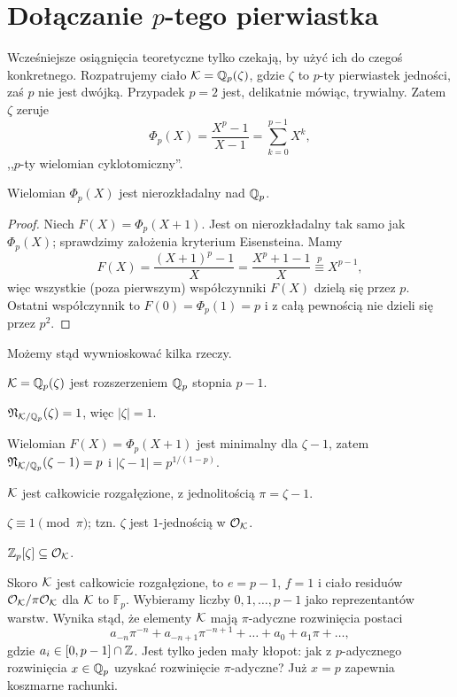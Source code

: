 \section{Dołączanie $p$-tego pierwiastka}
Wcześniejsze osiągnięcia teoretyczne tylko czekają, by użyć ich do czegoś konkretnego.
Rozpatrujemy ciało $\mathcal K = \mathbb Q_p(\zeta)$, gdzie $\zeta$ to $p$-ty pierwiastek jedności, zaś $p$ nie jest dwójką.
Przypadek $p = 2$ jest, delikatnie mówiąc, trywialny.
Zatem $\zeta$ zeruje
\[
	\Phi_p(X) = \frac{X^p-1}{X-1} = \sum_{k=0}^{p-1} X^k,
\]
,,$p$-ty wielomian cyklotomiczny''.

\begin{lemat}
	Wielomian $\Phi_p(X)$ jest nierozkładalny nad $\mathbb Q_p$.
\end{lemat}

\begin{proof}
	Niech $F(X) = \Phi_p(X+1)$. Jest on nierozkładalny tak samo jak $\Phi_p(X)$; sprawdzimy założenia kryterium Eisensteina.
	Mamy
	\[
		F(X)  = \frac{(X+1)^p - 1}{X} = \frac{X^p + 1 - 1}{X} \stackrel {p} \equiv X^{p-1},
	\]
	więc wszystkie (poza pierwszym) współczynniki $F(X)$ dzielą się przez $p$.
	Ostatni współczynnik to $F(0) = \Phi_p(1) = p$ i z całą pewnością nie dzieli się przez $p^2$.
\end{proof}

Możemy stąd wywnioskować kilka rzeczy.
\begin{enumx}
	\item $\mathcal K = \mathbb Q_p(\zeta)$ jest rozszerzeniem $\mathbb Q_p$ stopnia $p-1$.
	\item $\mathfrak N_{\mathcal K/ \mathbb Q_p}(\zeta) = 1$, więc $|\zeta| = 1$.
	\item Wielomian $F(X) = \Phi_p(X+1)$ jest minimalny dla $\zeta - 1$, zatem $\mathfrak N_{\mathcal K/\mathbb Q_p}(\zeta - 1) = p$ i $|\zeta-1| = p^{1/(1-p)}$.
	\item $\mathcal K$ jest całkowicie rozgałęzione, z jednolitością $\pi = \zeta- 1$.
	\item $\zeta \equiv 1 \pmod \pi$; tzn. $\zeta$ jest $1$-jednością w $\mathcal O_{\mathcal K}$.
	\item $\mathbb Z_p[\zeta] \subseteq \mathcal O_{\mathcal K}$.
\end{enumx}

Skoro $\mathcal K$ jest całkowicie rozgałęzione, to $e = p-1$, $f = 1$ i ciało residuów $\mathcal O_{\mathcal K} / \pi \mathcal O_{\mathcal K}$ dla $\mathcal K$ to $\mathbb F_p$.
Wybieramy liczby $0, 1, \dots, p-1$ jako reprezentantów warstw.
Wynika stąd, że elementy $\mathcal K$ mają $\pi$-adyczne rozwinięcia postaci
\[
	a_{-n}\pi^{-n} + a_{-n+1}\pi^{-n+1} + \ldots + a_0 + a_1 \pi + \ldots,
\]
gdzie $a_i \in [0, p-1] \cap \mathbb Z$.
Jest tylko jeden mały kłopot: jak z $p$-adycznego rozwinięcia $x \in \mathbb Q_p$ uzyskać rozwinięcie $\pi$-adyczne?
Już $x = p$ zapewnia koszmarne rachunki.


